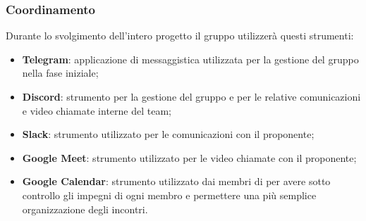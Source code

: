 \subsubsection{Coordinamento}









Durante lo svolgimento dell'intero progetto il gruppo utilizzerà questi strumenti:
\begin{itemize}
	\item \textbf{Telegram}: applicazione di messaggistica utilizzata per la gestione del gruppo nella fase iniziale;
	\item \textbf{Discord}: strumento per la gestione del gruppo e per le relative comunicazioni e video chiamate interne del team;
	\item \textbf{Slack}: strumento utilizzato per le comunicazioni con il proponente;
	\item \textbf{Google Meet}: strumento utilizzato per le video chiamate con il proponente;
	\item \textbf{Google Calendar}: strumento utilizzato dai membri di \Omicron{} per avere sotto controllo gli impegni di ogni membro e permettere una più semplice organizzazione degli incontri.
\end{itemize}